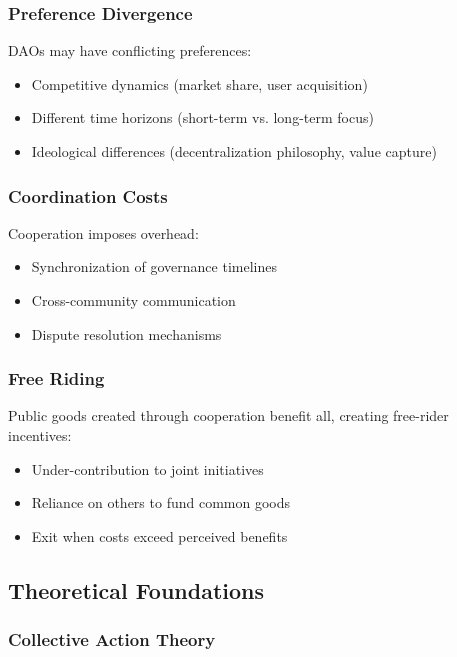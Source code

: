 \subsubsection{Preference Divergence}

DAOs may have conflicting preferences:
\begin{itemize}
    \item Competitive dynamics (market share, user acquisition)
    \item Different time horizons (short-term vs. long-term focus)
    \item Ideological differences (decentralization philosophy, value capture)
\end{itemize}

\subsubsection{Coordination Costs}

Cooperation imposes overhead:
\begin{itemize}
    \item Synchronization of governance timelines
    \item Cross-community communication
    \item Dispute resolution mechanisms
\end{itemize}

\subsubsection{Free Riding}

Public goods created through cooperation benefit all, creating free-rider incentives:
\begin{itemize}
    \item Under-contribution to joint initiatives
    \item Reliance on others to fund common goods
    \item Exit when costs exceed perceived benefits
\end{itemize}

\subsection{Theoretical Foundations}

\subsubsection{Collective Action Theory}

